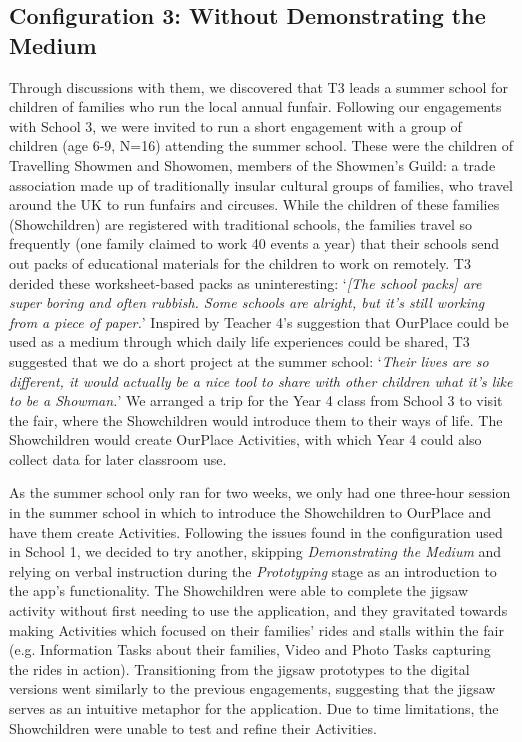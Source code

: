 \subsection{Configuration 3: Without Demonstrating the Medium}
Through discussions with them, we discovered that T3 leads a summer school for children of families who run the local annual funfair. Following our engagements with School 3, we were invited to run a short engagement with a group of children (age 6-9, N=16) attending the summer school. These were the children of Travelling Showmen and Showomen, members of the Showmen's Guild: a trade association made up of traditionally insular cultural groups of families, who travel around the UK to run funfairs and circuses. While the children of these families (Showchildren) are registered with traditional schools, the families travel so frequently (one family claimed to work 40 events a year) that their schools send out packs of educational materials for the children to work on remotely. T3 derided these worksheet-based packs as uninteresting: `\textit{[The school packs] are super boring and often rubbish. Some schools are alright, but it's still working from a piece of paper.}' Inspired by Teacher 4's suggestion that OurPlace could be used as a medium through which daily life experiences could be shared, T3 suggested that we do a short project at the summer school: `\textit{Their lives are so different, it would actually be a nice tool to share with other children what it's like to be a Showman.}' We arranged a trip for the Year 4 class from School 3 to visit the fair, where the Showchildren would introduce them to their ways of life. The Showchildren would create OurPlace Activities, with which Year 4 could also collect data for later classroom use.

As the summer school only ran for two weeks, we only had one three-hour session in the summer school in which to introduce the Showchildren to OurPlace and have them create Activities. Following the issues found in the configuration used in School 1, we decided to try another, skipping \textit{Demonstrating the Medium} and relying on verbal instruction during the \textit{Prototyping} stage as an introduction to the app's functionality. The Showchildren were able to complete the jigsaw activity without first needing to use the application, and they gravitated towards making Activities which focused on their families' rides and stalls within the fair (e.g. Information Tasks about their families, Video and Photo Tasks capturing the rides in action). Transitioning from the jigsaw prototypes to the digital versions went similarly to the previous engagements, suggesting that the jigsaw serves as an intuitive metaphor for the application. Due to time limitations, the Showchildren were unable to test and refine their Activities.

